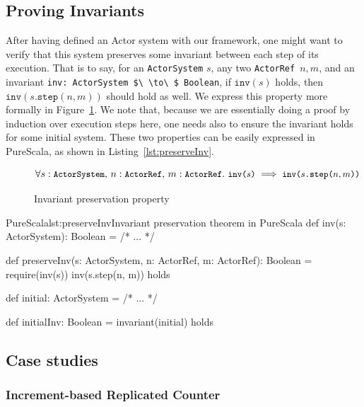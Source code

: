 \documentclass[a4paper,twoside]{article}
\newcommand{\InlineS}[1]{\lstinline[language=PureScala,basicstyle=\small\ttfamily,columns=fixed]|#1|}
\newcommand{\RefFig}[1]{Figure~\ref{#1}}
\newcommand{\RefCode}[1]{Listing~\ref{#1}}
\newcommand{\ActorRef}{\InlineS{ActorRef}\ }
\newcommand{\stt}[1]{\texttt{\small{#1}}}
\begin{document}
\subsection{Proving Invariants}
\label{invariants}

After having defined an Actor system with our framework, one might want to verify that this system preserves some invariant between each step of its execution. That is to say, for an \InlineS{ActorSystem} $s$, any two \ActorRef $n, m$, and an invariant \InlineS{inv: ActorSystem $\ \to\ $ Boolean}, if $\texttt{inv}(s)$ holds, then $\texttt{inv}(s\texttt{.step}(n, m))$ should hold as well. We express this property more formally in \RefFig{fig:stepinvariant}. We note that, because we are essentially doing a proof by induction over execution steps here, one needs also to ensure the invariant holds for some initial system. These two properties can be easily expressed in PureScala, as shown in \RefCode{lst:preserveInv}. 

\begin{figure}[!h]
$$\forall s: \stt{ActorSystem},\, n: \stt{ActorRef},\, m: \stt{ActorRef}.\ \stt{inv($s$)} \implies \stt{inv($s$.step($n, m$))}$$
\vspace{-20pt}
\caption{Invariant preservation property\label{fig:stepinvariant}}
\end{figure}

\begin{Code}{PureScala}{lst:preserveInv}{Invariant preservation theorem in PureScala}
def inv(s: ActorSystem): Boolean = {
  /* ... */
}

def preserveInv(s: ActorSystem, n: ActorRef, m: ActorRef): Boolean = {
  require(inv(s))
  inv(s.step(n, m))
} holds

def initial: ActorSystem = /* ... */

def initialInv: Boolean = {
  invariant(initial)
} holds
\end{Code}

\subsection{Case studies}
\label{casestudies}

\subsubsection{Increment-based Replicated Counter}
\label{repcounterinc}
\end{document}
